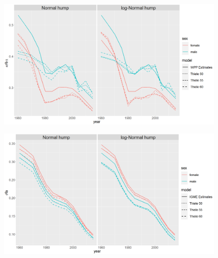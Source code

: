 \documentclass[12pt,a4paper]{article}
\begin{document}
\newpage
\begin{figure}[H]
\includegraphics[width = \linewidth]{q4515.png}
\end{figure}
\begin{figure}[H]
\includegraphics[width = \linewidth]{q50.png}
\end{figure}
\end{document}
